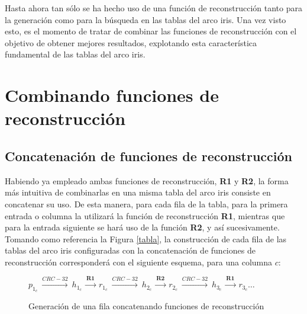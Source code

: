 \documentclass[12pt,spanish,listoffigures,listoftables,listofalgorithms]{tfgetsinf}
\begin{document}
Hasta ahora tan sólo se ha hecho uso de una función de reconstrucción tanto para la generación como para la búsqueda en las tablas del arco iris. Una vez visto esto, es el momento de tratar de combinar las funciones de reconstrucción con el objetivo de obtener mejores resultados, explotando esta característica fundamental de las tablas del arco iris.

\section{Combinando funciones de reconstrucción}

\subsection{Concatenación de funciones de reconstrucción}

Habiendo ya empleado ambas funciones de reconstrucción, \textbf{R1} y \textbf{R2}, la forma más intuitiva de combinarlas en una misma tabla del arco iris consiste en concatenar su uso. De esta manera, para cada fila de la tabla, para la primera entrada o columna la utilizará la función de reconstrucción \textbf{R1}, mientras que para la entrada siguiente se hará uso de la función \textbf{R2}, y así sucesivamente. Tomando como referencia la Figura \ref{tabla}, la construcción de cada fila de las tablas del arco iris configuradas con la concatenación de funciones de reconstrucción corresponderá con el siguiente esquema, para una columna $c$:

\begin{figure}[H]

	\centering

	$p_{1_c}~ \xrightarrow{CRC-32}~ h_{1_c}~ \xrightarrow{\textbf{R1}}~ r_{1_c}~ \xrightarrow{CRC-32}~ h_{2_c}~ \xrightarrow{\textbf{R2}}~ r_{2_c}~ \xrightarrow{CRC-32}~ h_{3_c}~ \xrightarrow{\textbf{R1}}~ r_{3_c} \dots$ \\

	\caption{Generación de una fila concatenando funciones de reconstrucción}
	\label{filaR1R2}
	 
\end{figure}
\end{document}
